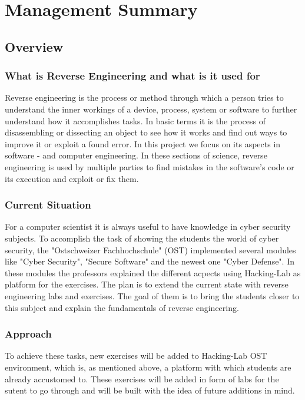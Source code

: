 \chapter{Management Summary}
\section{Overview}
\subsection{What is Reverse Engineering and what is it used for}
Reverse engineering is the process or method through which a person tries to understand the inner workings of a device, process, system or software to further understand how it accomplishes tasks. In basic terms it is the process of disassembling or dissecting an object to see how it works and find out ways to improve it or exploit a found error. In this project we focus on its aspects in software - and computer engineering. In these sections of science, reverse engineering is used by multiple parties to find mistakes in the software's code or its execution and exploit or fix them. 

\subsection{Current Situation}
For a computer scientist it is always useful to have knowledge in cyber security subjects. To accomplish the task of showing the students the world of cyber security, the "Ostschweizer Fachhochschule" (OST) implemented several modules like "Cyber Security", "Secure Software" and the newest one "Cyber Defense". In these modules the professors explained the different acpects using Hacking-Lab as platform for the exercises. The plan is to extend the current state with reverse engineering labs and exercises. The goal of them is to bring the students closer to this subject and explain the fundamentals of reverse engineering.

\subsection{Approach}
To achieve these tasks, new exercises will be added to Hacking-Lab OST environment, which is, as mentioned above, a platform with which students are already accustomed to. These exercises will be added in form of labs for the sutent to go through and will be built with the idea of future additions in mind.

